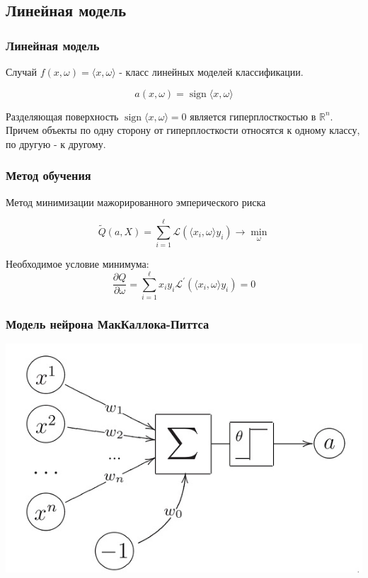 \documentclass{beamer}
\DeclareMathOperator{\sign}{sign}
\begin{document}
	\subsection{Линейная модель}
	
	\begin{frame}
		\frametitle{Линейная модель}
		
		Случай $f(x, \omega) = \langle x, \omega \rangle$ - класс линейных моделей классификации.
		
		\[
		a(x, \omega) = \sign \langle x, \omega \rangle
		\]
		
		Разделяющая поверхность $\sign \langle x, \omega \rangle = 0$ является гиперплосткостью в $\mathbb{R}^{n}$. Причем объекты по одну сторону от гиперплосткости относятся к одному классу, по другую - к другому.
	\end{frame}

	
	\begin{frame}
		\frametitle{Метод обучения}
		Метод минимизации мажорированного эмперического риска 
		
		\[
		\widetilde{Q}(a, X) = \sum_{i=1}^{\ell} \mathcal{L}(\langle x_i, \omega \rangle y_i) \rightarrow \min_{\omega}
		\]
		
		Необходимое условие минимума:
		\[
		\frac{\partial Q}{\partial \omega} = \sum_{i=1}^{\ell}  x_i y_i \mathcal{L}^{'}(\langle x_i, \omega \rangle y_i) = 0
		\]
	\end{frame}
	
	\begin{frame}
		\frametitle{Модель нейрона МакКаллока-Питтса}
				
		\includegraphics[width=\textwidth]{img/mk_pits.jpg}
	\end{frame}
	
\end{document}
